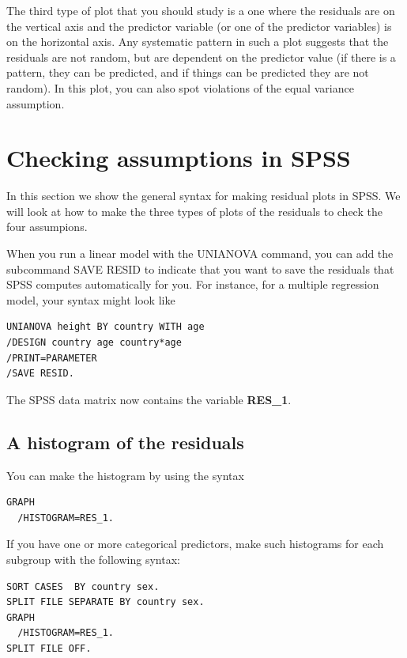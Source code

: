 \documentclass[]{book}\usepackage[]{graphicx}\usepackage[]{color}
\begin{document}
The third type of plot that you should study is a one where the residuals are on the vertical axis and the predictor variable (or one of the predictor variables) is on the horizontal axis. Any systematic pattern in such a plot suggests that the residuals are not random, but are dependent on the predictor value (if there is a pattern, they can be predicted, and if things can be predicted they are not random). In this plot, you can also spot violations of the equal variance assumption. 



\section{Checking assumptions in SPSS}


In this section we show the general syntax for making residual plots in SPSS. We will look at how to make the three types of plots of the residuals to check the four assumpions.


When you run a linear model with the UNIANOVA command, you can add the subcommand SAVE RESID to indicate that you want to save the residuals that SPSS computes automatically for you. For instance, for a multiple regression model, your syntax might look like 

\begin{verbatim}
UNIANOVA height BY country WITH age
/DESIGN country age country*age 
/PRINT=PARAMETER
/SAVE RESID.
\end{verbatim}

The SPSS data matrix now contains the variable \textbf{RES\_1}. 



\subsection{A histogram of the residuals}

You can make the histogram by using the syntax

\begin{verbatim}
GRAPH
  /HISTOGRAM=RES_1.
\end{verbatim}

If you have one or more categorical predictors, make such histograms for each subgroup with the following syntax:

\begin{verbatim}
SORT CASES  BY country sex.
SPLIT FILE SEPARATE BY country sex.
GRAPH
  /HISTOGRAM=RES_1.
SPLIT FILE OFF. 
\end{verbatim}
\end{document}
